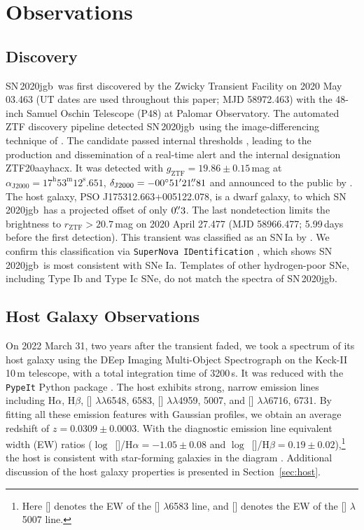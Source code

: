 \documentclass[twocolumn]{aastex631}
\newcommand{\sn}{SN\,2020jgb}
\begin{document}
\section{Observations} \label{sec:obs}
\subsection{Discovery}

\sn\ was first discovered by the Zwicky Transient Facility \citep[ZTF;][]{Bellm_ZTF_2019a,Graham_ZTF_2019, Dekany_ZTF_2020} on 2020 May 03.463 (UT dates are used throughout this paper; MJD 58972.463) with the 48-inch Samuel Oschin Telescope (P48) at Palomar Observatory. The automated ZTF discovery pipeline \citep{Masci_ZTF_2019} detected \sn\ using the image-differencing technique of \citet{Zackay_imagesub_2016}. The candidate passed internal thresholds \citep[e.g.,][]{Mahabal_ZTFML_2019, Duev_ZTFML_2019}, leading to the production and dissemination of a real-time alert \citep{Patterson_ZTFalert_2019} and the internal designation ZTF20aayhacx. It was detected with $g_\mathrm{ZTF} = 19.86 \pm 0.15\,$mag at $\alpha_\mathrm{J2000}=17^\mathrm{h}53^\mathrm{m}12^\mathrm{s}.651$, $\delta_\mathrm{J2000}=-00^\circ51'21\mbox{$.\!\!^{\prime\prime}$}{81}$ and announced to the public by \citet{Fremling_report_2020}. The host galaxy, PSO J175312.663+005122.078, is a dwarf galaxy, to which \sn\ has a projected offset of only $0\mbox{$.\!\!^{\prime\prime}$}3$. The last nondetection limits the brightness to $r_\mathrm{ZTF} > 20.7$\,mag on 2020 April 27.477 (MJD 58966.477; 5.99\,days before the first detection). This transient was classified as an SN\,Ia by \citet{TNS_2020}. We confirm this classification via \texttt{SuperNova IDentification} \citep[\texttt{SNID};][]{Blondin_SNID_2007}, which shows \sn\ is most consistent with SNe Ia. Templates of other hydrogen-poor SNe, including Type Ib and Type Ic SNe, do not match the spectra of \sn.

\subsection{Host Galaxy Observations}
On 2022 March 31, two years after the transient faded, we took a spectrum of its host galaxy using the DEep Imaging Multi-Object Spectrograph \citep[DEIMOS;][]{DEIMOS_2003} on the Keck-II 10\,m telescope, with a total integration time of 3200\,s. It was reduced with the \texttt{PypeIt} Python package \citep{pypeit:joss_pub}. The host exhibits strong, narrow emission lines including H$\alpha$, H$\beta$, [] $\lambda\lambda$6548, 6583, [] $\lambda\lambda$4959, 5007, and [] $\lambda\lambda$6716, 6731. By fitting all these emission features with Gaussian profiles, we obtain an average redshift of $z=0.0309\pm0.0003$. With the diagnostic emission line equivalent width (EW) ratios ($\log$~[]/H$\alpha=-1.05\pm0.08$ and $\log$~[]/H$\beta=0.19\pm0.02$),\footnote{Here [] denotes the EW of the [] $\lambda$6583 line, and [] denotes the EW of the [] $\lambda$5007 line.} the host is consistent with star-forming galaxies in the \citet[][hereafter BPT]{BPT_1981} diagram \citep[see also][]{Veilleux_1987}. Additional discussion of the host galaxy properties is presented in Section~\ref{sec:host}.
\end{document}
